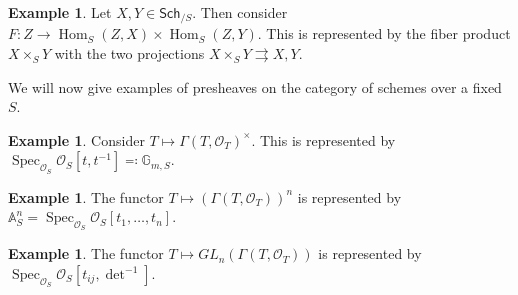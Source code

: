 \documentclass[leqno, openany]{memoir}
\theoremstyle{definition}
\newtheorem{exm}[thm]{Example}
\theoremstyle{remark}
\theoremstyle{plain}
\theoremstyle{definition}
\theoremstyle{remark}
\newcommand{\A}{\mathbb{A}}
\newcommand{\mc}[1]{\mathcal{#1}}
\newcommand{\ms}[1]{\mathsf{#1}}
\DeclareMathOperator{\Hom}{Hom}
\DeclareMathOperator{\Spec}{Spec}
\begin{document}
\begin{exm} Let $X,Y \in \ms{Sch}_{/S}$. Then consider $F \colon Z \to
\Hom_S(Z,X) \times \Hom_S(Z,Y)$. This is represented by the fiber product $X
\times_S Y$ with the two projections $X \times_S Y \rightrightarrows X,Y$.
\end{exm}

We will now give examples of presheaves on the category of schemes over a fixed
$S$.

\begin{exm} Consider $T \mapsto { \Gamma(T, \mc{O}_T) }^{\times}$. This is
represented by $\Spec_{ \mc{O}_S } \mc{O}_S[t, t^{-1}] \eqqcolon \mathbb{G}_{m,
S}$.  \end{exm}

\begin{exm} The functor $T \mapsto {(\Gamma(T, \mc{O}_T))}^n$ is represented by
$\A^n_S = \Spec_{\mc{O}_S} \mc{O}_S[t_1, \ldots, t_n]$.  \end{exm}

\begin{exm} The functor $T \mapsto GL_n(\Gamma(T, \mc{O}_T))$ is represented by
$\Spec_{\mc{O}_S} \mc{O}_S[t_{ij}, \det^{-1}]$.  \end{exm}
\end{document}

